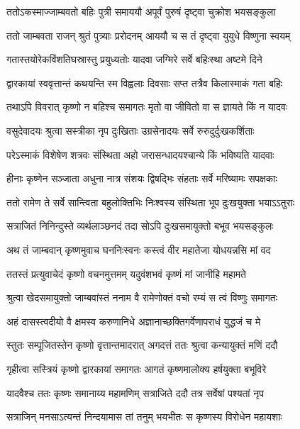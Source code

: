 \twolineshloka
{ततोऽकस्माज्जाम्बवतो बहिः पुत्री समाययौ}
{अपूर्वं पुरुषं दृष्ट्वा चुक्रोश भयसङ्कुला} %

\twolineshloka
{ततो जाम्बवता राजन् श्रुतं पुत्र्याः प्ररोदनम्}
{आययौ च स तं दृष्ट्वा युयुधे विष्णुना स्वयम्} %

\twolineshloka
{गतास्तयोरेकविंशतिघस्रास्तु प्रयुध्यतोः}
{यादवा जग्मिरे सर्वे बहिःस्था अष्टमे दिने} %

\twolineshloka
{द्वारकायां स्ववृत्तान्तं कथयन्ति स्म विह्वलाः}
{दिवसाः सप्त तत्रैव किलास्माकं गता बहिः} %

\twolineshloka
{तथाऽपि विवरात् कृष्णो न बहिश्च समागतः}
{मृतो वा जीवितो वा स ज्ञायते किं न यादवः} %

\twolineshloka
{वसुदेवादयः श्रुत्वा सस्त्रीका नृप दुःखिताः}
{उग्रसेनादयः सर्वे रुरुदुर्दुःखकर्शिताः} %

\twolineshloka
{परेऽस्माकं विशेषेण शत्रवः संस्थिता अहो}
{जरासन्धादयश्चान्ये किं भविष्यति यादवाः} %

\twolineshloka
{हीनाः कृष्णेन सञ्जाता अधुना नात्र संशयः}
{द्विषद्भिः संहताः सर्वे मरिष्यामः सपक्षकाः} %

\twolineshloka
{ततो रामेण ते सर्वे सान्त्विता बहुलोक्तिभिः}
{निःश्वस्य संस्थिता भूप दुःखयुक्ता भयाऽऽतुराः} %

\twolineshloka
{सत्राजितं निनिन्दुस्ते व्यर्थलाञ्छनदं तदा}
{सोऽपि दुःखसमायुक्तो बभूव भयसङ्कुलः} %

\twolineshloka
{अथ तं जाम्बवान् कृष्णमुवाच घननिःस्वनः}
{कस्त्वं वीर महातेजा योधयन्नसि मां वद} %

\twolineshloka
{ततस्तं प्रत्युवाचेदं कृष्णो वचनमुत्तमम्}
{यदुवंशभवं कृष्णं मां जानीहि महामते} %

\twolineshloka
{श्रुत्वा खेदसमायुक्तो जाम्बवांस्तं ननाम वै}
{रामेणोक्तं वचो रम्यं स त्वं विष्णुः समागतः} %

\twolineshloka
{अहं दासस्त्वदीयो वै क्षमस्व करुणानिधे}
{अज्ञानाच्छक्तिगर्वेणापराधं युद्धजं च मे} %

\twolineshloka
{स्तुतः सम्पूजितस्तेन कृष्णो वृत्तान्तमादरात्}
{अगदत्तं ततः श्रुत्वा कन्यायुक्तं मणिं ददौ} %

\twolineshloka
{गृहीत्वा सस्त्रियं कृष्णो द्वारकायां समागतः}
{आगतं कृष्णमालोक्य हर्षयुक्ता बभूविरे} %

\twolineshloka
{यादवैश्च ततः कृष्णः समानाय्य महामणिम्}
{सत्राजिते ददौ तत्र सर्वेषां पश्यतां नृप} %

\twolineshloka
{सत्राजिन् मनसाऽत्यन्तं निन्दयामास तां तनुम्}
{भयभीतः स कृष्णस्य विरोधेन महायशाः} %

